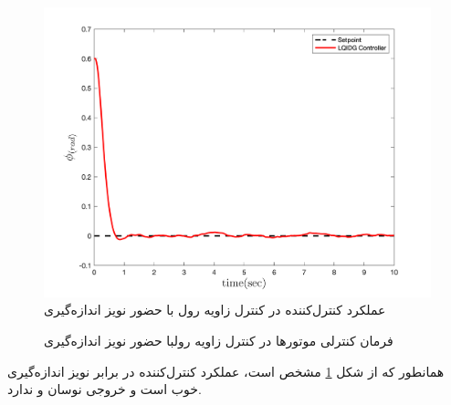 \begin{figure}[H]
	\includegraphics[width=.48\linewidth]{../Figures/MIL/LQIDG/Roll/lqidg_roll.png}
	\centering
	\caption{عملكرد کنترل‌کننده   در کنترل زاويه رول با حضور نويز اندازه‌گیری}
	\label{lqidg_roll_fig_simulation_n}
\end{figure}
\begin{figure}[H]
	\centering
	\caption{‫‪فرمان کنترلی موتورها در کنترل زاویه رولبا حضور نويز اندازه‌گیری}
\end{figure}
همانطور که از شکل
\ref{lqidg_roll_fig_simulation_n}
مشخص است، عملکرد کنترل‌کننده  در برابر نویز اندازه‌گیری خوب است و خروجی نوسان و ندارد.